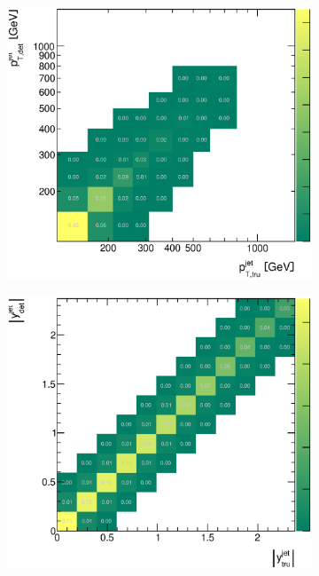 \documentclass[12pt, twoside]{article}
\numberwithin{equation}{section}
\numberwithin{figure}{section}
\newenvironment{changemargin}[2]{%
\begin{list}{}{%
\setlength{\topsep}{0pt}%
\setlength{\leftmargin}{#1}%
\setlength{\rightmargin}{#2}%
\setlength{\listparindent}{\parindent}%
\setlength{\itemindent}{\parindent}%
\setlength{\parsep}{\parskip}%
}%
\item[]}{\end{list}}
\begin{document}
\begin{figure}
\begin{changemargin}{-1.0cm}{-0.75cm}
\begin{changemargin}{-0.75cm}{-1.0cm}
        \vspace{0.2cm}
        \begin{subfigure}[b]{0.37\textwidth}
            \includegraphics[width=\textwidth]{./images/CorrelationMatricesSherpa/REC_vs_HAD-104.eps}
            \subcaption{}
            \label{fig:SherpaCorrelationPtJet}
        \end{subfigure}
        \begin{subfigure}[b]{0.37\textwidth}
            \includegraphics[width=\textwidth]{./images/CorrelationMatricesSherpa/REC_vs_HAD-105.eps}

\end{subfigure}
\end{changemargin}
\end{changemargin}
\end{figure}
\end{document}
